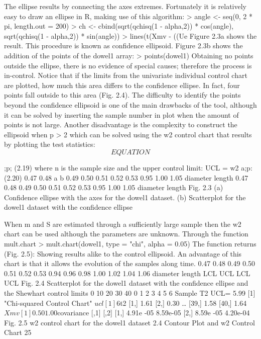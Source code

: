 \documentclass[a4paper,12pt]{article}
\begin{document}
The ellipse results by connecting the axes extremes.
Fortunately it is relatively easy to draw an ellipse in R, making use of this
algorithm:
> angle <- seq(0, 2 * pi, length.out = 200)
> ch <- cbind(sqrt(qchisq(1 - alpha,2)) * cos(angle), sqrt(qchisq(1 - alpha,2)) *
sin(angle))
> lines(t(Xmv - ((Ue %
Figure 2.3a shows the result.
This procedure is known as confidence ellipsoid. Figure 2.3b shows the addition
of the points of the dowel1 array:
> points(dowel1)
Obtaining no points outside the ellipse, there is no evidence of special causes;
therefore the process is in-control. Notice that if the limits from the univariate
individual control chart are plotted, how much this area differs to the confidence
ellipse. In fact, four points fall outside to this area (Fig. 2.4).
The difficulty to identify the points beyond the confidence ellipsoid is one of the
main drawbacks of the tool, although it can be solved by inserting the sample
number in plot when the amount of points is not large.
Another disadvantage is the complexity to construct the ellipsoid when p > 2
which can be solved using the w2 control chart that results by plotting the test
statistics:
\[EQUATION\]

;p; (2.19)
where n is the sample size and the upper control limit:
UCL = w2
a;p: (2.20)
0.47 0.48
a b
0.49 0.50 0.51 0.52 0.53
0.95 1.00 1.05
diameter
length
0.47 0.48 0.49 0.50 0.51 0.52 0.53
0.95 1.00 1.05
diameter
length
Fig. 2.3 (a) Confidence ellipse with the axes for the dowel1 dataset. (b) Scatterplot for the dowel1
dataset with the confidence ellipse

When m and S are estimated through a sufficiently large sample then the w2 chart
can be used although the parameters are unknown.
Through the function mult.chart
> mult.chart(dowel1, type = "chi", alpha = 0.05)
The function returns (Fig. 2.5):
Showing results alike to the control ellipsoid. An advantage of this chart is that it
allows the evolution of the samples along time.
0.47 0.48 0.49 0.50 0.51 0.52 0.53
0.94 0.96 0.98 1.00 1.02 1.04 1.06
diameter
length
LCL UCL
LCL
UCL
Fig. 2.4 Scatterplot for
the dowel1 dataset with
the confidence ellipse
and the Shewhart control
limits
0 10 20 30 40
0
1
2
3
4
5
6
Sample
T2
UCL= 5.99
[1] "Chi-squared Control Chart"
$ucl
[1] 6
$t2
[1,] 1.61
[2,] 0.30
…
[39,] 1.58
[40,] 1.64
$Xmv
[1] 0.50 1.00
$covariance
[,1] [,2]
[1,] 4.91e -05 8.59e-05
[2,] 8.59e -05 4.20e-04
Fig. 2.5 w2 control chart for the dowel1 dataset
2.4 Contour Plot and w2 Control Chart 25
\end{document}
